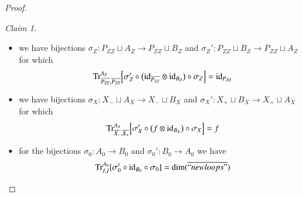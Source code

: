 \documentclass{amsart}
\def\tn{\textnormal}
\def\dim{\tn{dim}}
\def\Trace{\tn{Tr}}
\def\to{\rightarrow}
\def\ol{\overline}
\def\id{\tn{id}}
\newcommand{\inp}[1]{{#1_-}}
\newcommand{\outp}[1]{{#1_+}}
\theoremstyle{remark}
\newtheorem{claim}[subsubsection]{Claim}
\theoremstyle{definition}
\begin{document}
\begin{proof}
\begin{claim}\mbox{}
 \begin{itemize}
  \item we have bijections $\sigma_Z:P_{ZZ}\sqcup A_Z\to P_{ZZ}\sqcup B_Z$ and $\sigma_Z':P_{ZZ}\sqcup B_Z\to P_{ZZ}\sqcup A_Z$ for which
  \[\Trace_{\ol{P_{ZZ}},\ol{P_{ZZ}}}^{A_Z}\Big[\sigma_Z'\circ\big(\id_{\ol{P_{ZZ}}}\otimes\id_{B_Z}\big)\circ\sigma_Z\Big]=\id_{P_{ZZ}}\]
  \item we have bijections $\sigma_X:\inp{X}\sqcup A_X\to \inp{X}\sqcup B_X$ and $\sigma_X':\outp{X}\sqcup B_X\to \outp{X}\sqcup A_X$ for which
  \[\Trace_{\ol{\inp{X}},\ol{\outp{X}}}^{A_X}\Big[\sigma_X'\circ\big(f\otimes\id_{B_X}\big)\circ\sigma_X\Big]=f\]
  \item for the bijections $\sigma_0:A_0\to B_0$ and $\sigma_0':B_0\to A_0$ we have
  \[\Trace_{I,I}^{A_0}[\sigma_0'\circ\id_{B_0}\circ\sigma_0]=\dim(\ol{``newloops"})\]
 \end{itemize}
\end{claim}


\end{proof}
\end{document}

